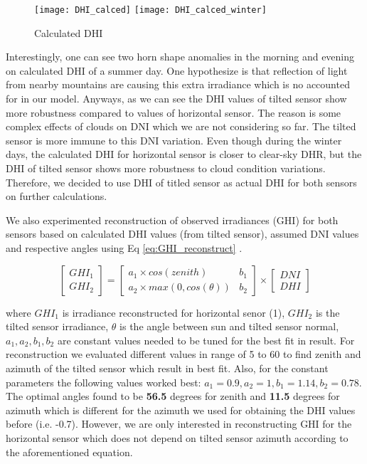 \begin{figure}[h]
\caption{Calculated DHI}
\label{fig:calc_DHI_day}
\texttt{[image: DHI\_calced]}
\texttt{[image: DHI\_calced\_winter]}
\centering
\end{figure}

Interestingly, one can see two horn shape anomalies in the morning and evening on calculated DHI of a summer day. One hypothesize is that reflection of light from nearby mountains are causing this extra irradiance which is no accounted for in our model. Anyways, as we can see the DHI values of tilted sensor show more robustness compared to values of horizontal sensor. The reason is some complex effects of clouds on DNI which we are not considering so far. The tilted sensor is more immune to this DNI variation. Even though during the winter days, the calculated DHI for horizontal sensor is closer to clear-sky DHR, but the DHI of tilted sensor shows more robustness to cloud condition variations. Therefore, we decided to use DHI of titled sensor as actual DHI for both sensors on further calculations.

We also experimented reconstruction of observed irradiances (GHI) for both sensors based on calculated DHI values (from tilted sensor), assumed DNI values and respective angles using Eq \ref{eq:GHI_reconstruct} . 

\begin{equation}
\label{eq:GHI_reconstruct}
\left[ \begin{array}{c} GHI_1 \\ GHI_2 \end{array} \right] = \begin{bmatrix} a_1 \times cos(zenith) & b_1 \\ a_2 \times max(0, cos(\theta)) & b_2 \end{bmatrix} \times \left[ \begin{array}{c} DNI \\ DHI \end{array} \right]
\end{equation}

where $GHI_1$ is irradiance reconstructed for horizontal senor (1), $GHI_2$ is the tilted sensor irradiance, $\theta$ is the angle between sun and tilted sensor normal, $a_1, a_2, b_1, b_2$ are constant values needed to be tuned for the best fit in result. For reconstruction we evaluated different values in range of 5 to 60 to find zenith and azimuth of the tilted sensor which result in best fit. Also, for the constant parameters the following values worked best: $a_1=0.9, a_2=1, b_1=1.14, b_2=0.78$. The optimal angles found to be \textbf{56.5} degrees for zenith and \textbf{11.5} degrees for azimuth which is different for the azimuth we used for obtaining the DHI values before (i.e. -0.7). However, we are only interested in reconstructing GHI for the horizontal sensor which does not depend on tilted sensor azimuth according to the aforementioned equation.

